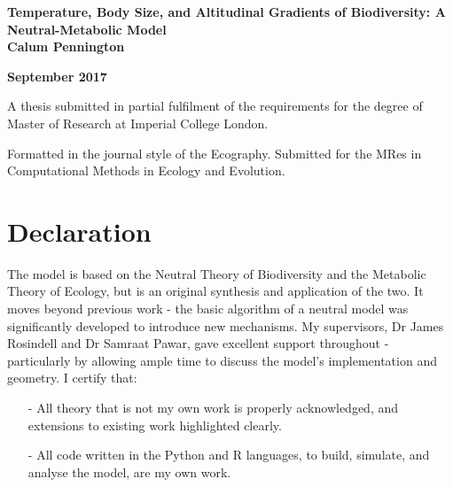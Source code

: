 \documentclass[11pt]{article}
\title{}
\author{}
\date{}
\begin{document}
\begin{titlepage}
	\begin{center}
		\vspace*{3cm}
		\huge
		\textbf{Temperature, Body Size, and Altitudinal Gradients of Biodiversity: A Neutral-Metabolic Model}\\ %
		
		\vspace{1.5cm}
		\LARGE
		\textbf{Calum Pennington}
		
		\textbf{September 2017}
		
		\vspace{1.5cm}
		\LARGE
		A thesis submitted in partial fulfilment of the requirements for the degree of Master of Research at Imperial College London.
		
		\vspace{1.5cm}
		Formatted in the journal style of the Ecography. Submitted for the MRes in Computational Methods in Ecology and Evolution.
		\vfill
	\end{center}
	
\end{titlepage}

\linenumbers

\section*{Declaration}
The model is based on the Neutral Theory of Biodiversity and the Metabolic Theory of Ecology, but is an original synthesis and application of the two. It moves beyond previous work - the basic algorithm of a neutral model was significantly developed to introduce new mechanisms. My supervisors, Dr James Rosindell and Dr Samraat Pawar, gave excellent support throughout - particularly by allowing ample time to discuss the model's implementation and geometry. I certify that:
\begin{itemize}
\item[-] All theory that is not my own work is properly acknowledged, and extensions to existing work highlighted clearly.
\item[-] All code written in the Python and R languages, to build, simulate, and analyse the model, are my own work.
\end{itemize}


\newpage
\end{document}
